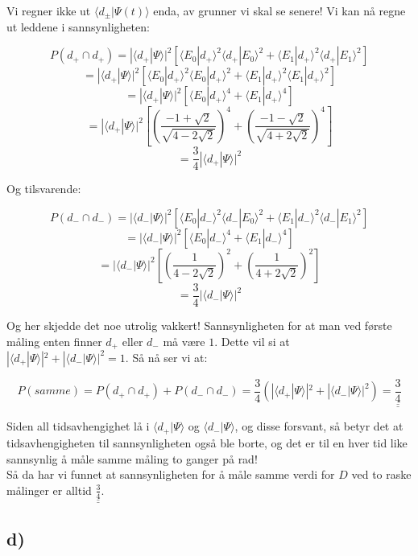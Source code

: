 \documentclass[a4paper,norsk, 10pt]{article}
\numberwithin{equation}{section}
\begin{document}
Vi regner ikke ut $\langle d_{\pm}|\Psi(t)\rangle$ enda, av grunner vi skal se senere! Vi kan nå regne ut leddene i sannsynligheten:

$$
P(d_+ \cap d_+) = |\langle d_+|\Psi\rangle|^2\left[\langle E_0|d_+\rangle^2\langle d_+|E_0\rangle^2 + \langle E_1|d_+\rangle^2\langle d_+|E_1\rangle^2\right]
$$
$$
= |\langle d_+|\Psi\rangle|^2\left[\langle E_0|d_+\rangle^2\langle E_0|d_+\rangle^2 + \langle E_1|d_+\rangle^2\langle E_1|d_+\rangle^2\right]
$$
$$
= |\langle d_+|\Psi\rangle|^2\left[\langle E_0|d_+\rangle^4 + \langle E_1|d_+\rangle^4\right]
$$
$$
= |\langle d_+|\Psi\rangle|^2\left[\left(\frac{-1+\sqrt{2}}{\sqrt{4-2\sqrt{2}}}\right)^4 + \left(\frac{-1-\sqrt{2}}{\sqrt{4+2\sqrt{2}}}\right)^4\right]
$$
$$
= \frac{3}{4}|\langle d_+|\Psi\rangle|^2
$$

Og tilsvarende:

$$
P(d_- \cap d_-) = |\langle d_-|\Psi\rangle|^2\left[\langle E_0|d_-\rangle^2\langle d_-|E_0\rangle^2 + \langle E_1|d_-\rangle^2\langle d_-|E_1\rangle^2\right]
$$
$$
= |\langle d_-|\Psi\rangle|^2\left[\langle E_0|d_-\rangle^4 + \langle E_1|d_-\rangle^4\right]
$$
$$
= |\langle d_-|\Psi\rangle|^2\left[ \left(\frac{1}{4-2\sqrt{2}}\right)^2 + \left(\frac{1}{4+2\sqrt{2}}\right)^2\right]
$$
$$
= \frac{3}{4}|\langle d_-|\Psi\rangle|^2
$$

Og her skjedde det noe utrolig vakkert! Sannsynligheten for at man ved første måling enten finner $d_+$ eller $d_-$ må være $1$. Dette vil si at $|\langle d_+|\Psi\rangle|^2 + |\langle d_-|\Psi\rangle|^2 = 1$. Så nå ser vi at:

\begin{equation}
P(samme) = P(d_+ \cap d_+) + P(d_- \cap d_-) = \frac{3}{4}\left(|\langle d_+|\Psi\rangle|^2 + |\langle d_-|\Psi\rangle|^2\right) = \underline{\underline{\frac{3}{4}}}
\end{equation}

Siden all tidsavhengighet lå i $\langle d_+|\Psi\rangle$ og $\langle d_-|\Psi\rangle$, og disse forsvant, så betyr det at tidsavhengigheten til sannsynligheten også ble borte, og det er til en hver tid like sannsynlig å måle samme måling to ganger på rad!\\


Så da har vi funnet at sannsynligheten for å måle samme verdi for $D$ ved to raske målinger er alltid $\underline{\underline{\frac{3}{4}}}$.

\subsection*{d)}
\end{document}

